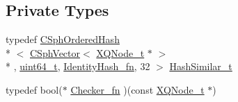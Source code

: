\subsection*{Private Types}
\begin{DoxyCompactItemize}
\item 
typedef \hyperlink{classCSphOrderedHash}{C\-Sph\-Ordered\-Hash}\\*
$<$ \hyperlink{classCSphVector}{C\-Sph\-Vector}$<$ \hyperlink{structXQNode__t}{X\-Q\-Node\-\_\-t} $\ast$ $>$\\*
, \hyperlink{sphinxstd_8h_aaa5d1cd013383c889537491c3cfd9aad}{uint64\-\_\-t}, \hyperlink{structIdentityHash__fn}{Identity\-Hash\-\_\-fn}, 32 $>$ \hyperlink{classCSphTransformation_ac577c5486ae52a9b956ca6974fa77ab6}{Hash\-Similar\-\_\-t}
\item 
typedef bool($\ast$ \hyperlink{classCSphTransformation_a4dd48bef2df238bb92404413ebdaf62d}{Checker\-\_\-fn} )(const \hyperlink{structXQNode__t}{X\-Q\-Node\-\_\-t} $\ast$)
\end{DoxyCompactItemize}
